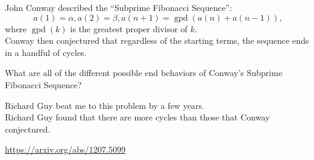 \documentclass{article}
\begin{document}
  John Conway described the ``Subprime Fibonacci Sequence'': \[
    a(1) = \alpha, a(2) = \beta, a(n + 1) = \operatorname{gpd}(a(n) + a(n - 1)),
  \] where $\operatorname{gpd}(k)$ is the greatest proper divisor of $k$.\\
  Conway then conjectured that regardless of the starting terms, the sequence
  ends in a handful of cycles.

\begin{question}
  What are all of the different possible end behaviors of
  Conway's Subprime Fibonacci Sequence?
\end{question}

\begin{note}
  Richard Guy beat me to this problem by a few years.\\
  Richard Guy found that there are more cycles than
  those that Conway conjectured.
\end{note}

\begin{references}
  \item \url{https://arxiv.org/abs/1207.5099}
\end{references}
\end{document}
